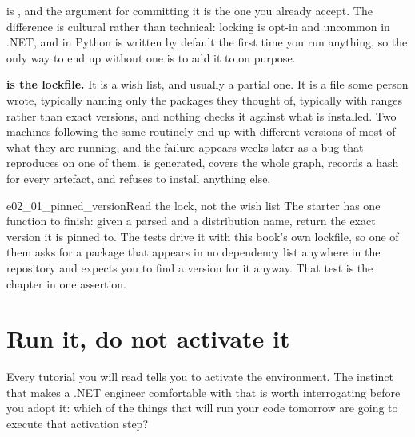 \begin{csbox}
 is , and the argument for committing
it is the one you already accept. The difference is cultural rather than
technical: locking is opt-in and uncommon in .NET, and in Python
 is written by default the first time you run anything, so the
only way to end up without one is to add it to  on purpose.
\end{csbox}

\begin{trapbox}
\textbf{ is the lockfile.} It is a wish list, and
usually a partial one. It is a file some person wrote, typically naming only
the packages they thought of, typically with ranges rather than exact
versions, and nothing checks it against what is installed. Two machines
following the same  routinely end up with different
versions of most of what they are running, and the failure appears weeks
later as a bug that reproduces on one of them.  is generated,
covers the whole graph, records a hash for every artefact, and
 refuses to install anything else.
\end{trapbox}


\begin{exercise}{e02_01_pinned_version}{Read the lock, not the wish list}
The starter has one function to finish: given a parsed  and a
distribution name, return the exact version it is pinned to. The tests drive
it with this book's own lockfile, so one of them asks for a package that
appears in no dependency list anywhere in the repository \dash{} and expects
you to find a version for it anyway. That test is the chapter in one
assertion.
\end{exercise}

\section{Run it, do not activate it}
\label{sec:ch02-run}

\noindent
Every tutorial you will read tells you to activate the environment. The
instinct that makes a .NET engineer comfortable with that is worth
interrogating before you adopt it: which of the things that will run your code
tomorrow are going to execute that activation step?

